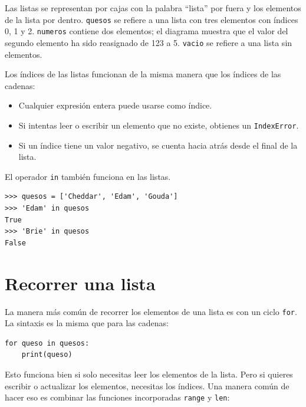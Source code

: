 \documentclass[10pt]{book}
\begin{document}
Las listas se representan por cajas con la palabra ``lista'' por fuera
y los elementos de la lista por dentro.  {\tt quesos} se refiere a
una lista con tres elementos con índices 0, 1 y 2.
{\tt numeros} contiene dos elementos; el diagrama muestra que el
valor del segundo elemento ha sido reasignado de 123 a 5.
{\tt vacio} se refiere a una lista sin elementos.

Los índices de las listas funcionan de la misma manera que los índices de las cadenas:

\begin{itemize}

\item Cualquier expresión entera puede usarse como índice.

\item Si intentas leer o escribir un elemento que no existe,
obtienes un {\tt IndexError}.

\item Si un índice tiene un valor negativo, se cuenta hacia atrás desde el
final de la lista.

\end{itemize}


El operador {\tt in} también funciona en las listas.

\begin{verbatim}
>>> quesos = ['Cheddar', 'Edam', 'Gouda']
>>> 'Edam' in quesos
True
>>> 'Brie' in quesos
False
\end{verbatim}


\section{Recorrer una lista}

La manera más común de recorrer los elementos de una lista es
con un ciclo {\tt for}.  La sintaxis es la misma que para las cadenas:

\begin{verbatim}
for queso in quesos:
    print(queso)
\end{verbatim}
%
Esto funciona bien si solo necesitas leer los elementos de la
lista.  Pero si quieres escribir o actualizar los elementos,
necesitas los índices.  Una manera común de hacer eso es combinar
las funciones incorporadas {\tt range} y {\tt len}:
\end{document}
